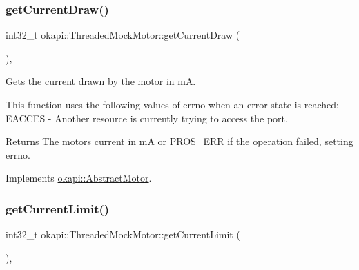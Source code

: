 \mbox{\label{classokapi_1_1ThreadedMockMotor_ad4fd90f6ac8f5ae9c0adcaab7d6043e5}} 
\subsubsection{\texorpdfstring{getCurrentDraw()}{getCurrentDraw()}}
{\footnotesize\ttfamily int32\+\_\+t okapi\+::\+Threaded\+Mock\+Motor\+::get\+Current\+Draw (\begin{DoxyParamCaption}{ }\end{DoxyParamCaption})\hspace{0.3cm}{\ttfamily [override]}, {\ttfamily [virtual]}}



Gets the current drawn by the motor in mA. 

This function uses the following values of errno when an error state is reached\+: E\+A\+C\+C\+ES -\/ Another resource is currently trying to access the port.

\begin{DoxyReturn}{Returns}
The motor\textquotesingle{}s current in mA or P\+R\+O\+S\+\_\+\+E\+RR if the operation failed, setting errno. 
\end{DoxyReturn}


Implements \mbox{\hyperlink{classokapi_1_1AbstractMotor_a755ad2c78a4b36cc56eef1029a3aa217}{okapi\+::\+Abstract\+Motor}}.

\mbox{\label{classokapi_1_1ThreadedMockMotor_a89ce5e19d25c433f1ff50cc9fa9dc197}} 
\subsubsection{\texorpdfstring{getCurrentLimit()}{getCurrentLimit()}}
{\footnotesize\ttfamily int32\+\_\+t okapi\+::\+Threaded\+Mock\+Motor\+::get\+Current\+Limit (\begin{DoxyParamCaption}{ }\end{DoxyParamCaption})\hspace{0.3cm}{\ttfamily [override]}, {\ttfamily [virtual]}}



